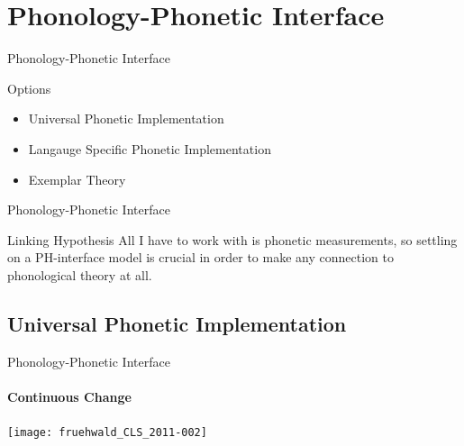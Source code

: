 \documentclass[]{beamer}
\begin{document}


\section{Phonology-Phonetic Interface}

\begin{frame}{Phonology-Phonetic Interface}

	\begin{block}{Options}
		\begin{itemize}
			\item Universal Phonetic Implementation
			\item Langauge Specific Phonetic Implementation
			\item Exemplar Theory
		\end{itemize}
	\end{block}

\end{frame}

\begin{frame}{Phonology-Phonetic Interface}
	
	\begin{block}{Linking Hypothesis}
		All I have to work with is phonetic measurements, so settling on a PH-interface model
		is crucial in order to make any connection to phonological theory at all.
	\end{block}

\end{frame}

\subsection{Universal Phonetic Implementation}




\begin{frame}{Phonology-Phonetic Interface}
	\framesubtitle{Continuous Change}

\texttt{[image: fruehwald\_CLS\_2011-002]}
	
	
\end{frame}
\end{document}

